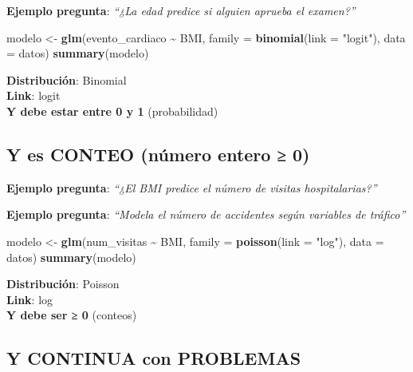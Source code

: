 \documentclass[
  10pt,
]{article}
\newenvironment{Shaded}{\begin{snugshade}}{\end{snugshade}}
\newcommand{\AttributeTok}[1]{\textcolor[rgb]{0.13,0.29,0.53}{#1}}
\newcommand{\FunctionTok}[1]{\textcolor[rgb]{0.13,0.29,0.53}{\textbf{#1}}}
\newcommand{\NormalTok}[1]{#1}
\newcommand{\OtherTok}[1]{\textcolor[rgb]{0.56,0.35,0.01}{#1}}
\newcommand{\SpecialCharTok}[1]{\textcolor[rgb]{0.81,0.36,0.00}{\textbf{#1}}}
\newcommand{\StringTok}[1]{\textcolor[rgb]{0.31,0.60,0.02}{#1}}
\begin{document}
\textbf{Ejemplo pregunta}: \emph{``¿La edad predice si alguien aprueba
el examen?''}

\begin{Shaded}
\begin{Highlighting}[]
\NormalTok{modelo }\OtherTok{\textless{}{-}} \FunctionTok{glm}\NormalTok{(evento\_cardiaco }\SpecialCharTok{\textasciitilde{}}\NormalTok{ BMI, }
              \AttributeTok{family =} \FunctionTok{binomial}\NormalTok{(}\AttributeTok{link =} \StringTok{"logit"}\NormalTok{),}
              \AttributeTok{data =}\NormalTok{ datos)}
\FunctionTok{summary}\NormalTok{(modelo)}
\end{Highlighting}
\end{Shaded}

\textbf{Distribución}: Binomial\\
\textbf{Link}: logit\\
\textbf{Y debe estar entre 0 y 1} (probabilidad)

\subsection{Y es CONTEO (número entero ≥
0)}\label{y-es-conteo-nuxfamero-entero-0}

\textbf{Ejemplo pregunta}: \emph{``¿El BMI predice el número de visitas
hospitalarias?''}

\textbf{Ejemplo pregunta}: \emph{``Modela el número de accidentes según
variables de tráfico''}

\begin{Shaded}
\begin{Highlighting}[]
\NormalTok{modelo }\OtherTok{\textless{}{-}} \FunctionTok{glm}\NormalTok{(num\_visitas }\SpecialCharTok{\textasciitilde{}}\NormalTok{ BMI, }
              \AttributeTok{family =} \FunctionTok{poisson}\NormalTok{(}\AttributeTok{link =} \StringTok{"log"}\NormalTok{),}
              \AttributeTok{data =}\NormalTok{ datos)}
\FunctionTok{summary}\NormalTok{(modelo)}
\end{Highlighting}
\end{Shaded}

\textbf{Distribución}: Poisson\\
\textbf{Link}: log\\
\textbf{Y debe ser ≥ 0} (conteos)

\subsection{Y CONTINUA con PROBLEMAS}\label{y-continua-con-problemas}
\end{document}
